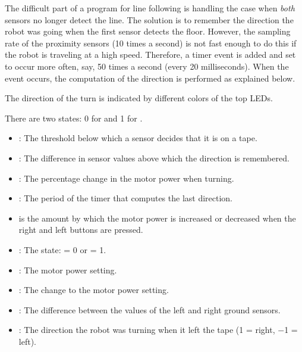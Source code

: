 The difficult part of a program for line following is handling the case
when \emph{both} sensors no longer detect the line. The solution is to
remember the direction the robot was going when the first sensor detects
the floor. However, the sampling rate of the proximity sensors (10 times
a second) is not fast enough to do this if the robot is traveling at a
high speed. Therefore, a timer event is added and set to occur more
often, say, 50 times a second (every 20 milliseconds). When the event
occurs, the computation of the direction is performed as explained
below.

The direction of the turn is indicated by different colors of the top
LEDs.


There are two states: 0 for  and 1 for .


\begin{itemize}
\item {}: The threshold below which a sensor decides that it
is on a tape.

\item {}: The difference in sensor values above which
the direction is remembered.

\item {}: The percentage change in the motor power when
turning.

\item {}: The period of the timer that computes the last
direction.

\item {} is the amount by which the motor power is increased
or decreased when the right and left buttons are pressed.
\end{itemize}


\begin{itemize}
\item {}: The state:  = 0 or  = 1. 
\item {}: The motor power setting.
\item {}: The change to the motor power setting.
\item {}: The difference between the values of the left and right
ground sensors. 
\item {}: The direction the robot was turning when it left the tape
(1 = right, $-$1 = left).
\end{itemize}

